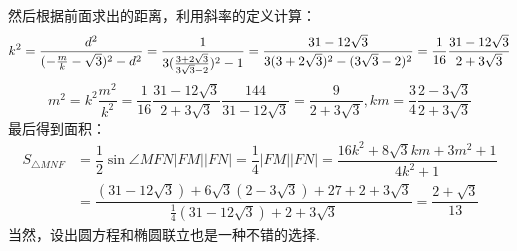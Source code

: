 \begin{solution}
    然后根据前面求出的距离，利用斜率的定义计算：
    \[k^2=\dfrac{d^2}{(-\frac{m}{k}-\sqrt3)^2-d^2}=\dfrac{1}{3(\frac{3+2\sqrt3}{3\sqrt3-2})^2-1}=\dfrac{31-12\sqrt3}{3(3+2\sqrt3)^2-(3\sqrt3-2)^2}=\dfrac{1}{16}\dfrac{31-12\sqrt3}{2+3\sqrt3}\vspace{-5pt}\]
    \[m^2=k^2\dfrac{m^2}{k^2}=\dfrac{1}{16}\dfrac{31-12\sqrt3}{2+3\sqrt3}\dfrac{144}{31-12\sqrt3}=\dfrac{9}{2+3\sqrt3},km=\dfrac34\dfrac{2-3\sqrt3}{2+3\sqrt3}\]\vspace{-10pt}
    最后得到面积：
    \begin{align*}
        S_{\triangle{MNF}}&=\dfrac12\sin\angle{MFN}|FM||FN|=\dfrac{1}{4}|FM||FN|=\dfrac{16k^2+8\sqrt{3}km+3m^2+1}{4k^2+1}\\
        &=\dfrac{(31-12\sqrt3)+6\sqrt{3}(2-3\sqrt3)+27+2+3\sqrt3}{\frac14(31-12\sqrt3)+2+3\sqrt3}=\dfrac{2+\sqrt3}{13}
    \end{align*}
    当然，设出圆方程和椭圆联立也是一种不错的选择.
\end{solution}
